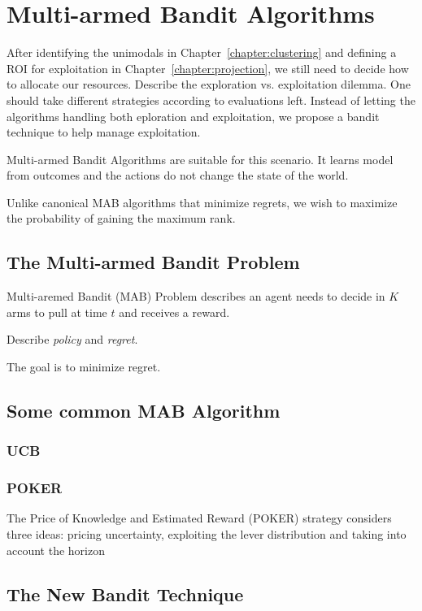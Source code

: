 \chapter{Multi-armed Bandit Algorithms}
\label{chapter:MAB}

After identifying the unimodals in Chapter~\ref{chapter:clustering} and defining a ROI for exploitation in Chapter~\ref{chapter:projection},
we still need to decide how to allocate our resources.
Describe the exploration vs. exploitation dilemma.
One should take different strategies according to evaluations left.
Instead of letting the algorithms handling both eploration and exploitation, we propose a bandit technique to help manage exploitation.


Multi-armed Bandit Algorithms are suitable for this scenario.
It learns model from outcomes and the actions do not change the state of the world.

Unlike canonical MAB algorithms that minimize regrets, we wish to maximize the probability of gaining the maximum rank.





\section{The Multi-armed Bandit Problem}

Multi-aremed Bandit (MAB) Problem describes an agent needs to decide in $K$ arms to pull at time $t$ and receives a reward.

Describe \textit{policy} and \textit{regret}.

The goal is to minimize regret.



\section{Some common MAB Algorithm}

\subsection{UCB}

\subsection{POKER}
The Price of Knowledge and Estimated Reward (POKER) strategy considers three ideas: pricing uncertainty, exploiting the lever distribution and taking into account the horizon


\section{The New Bandit Technique}


